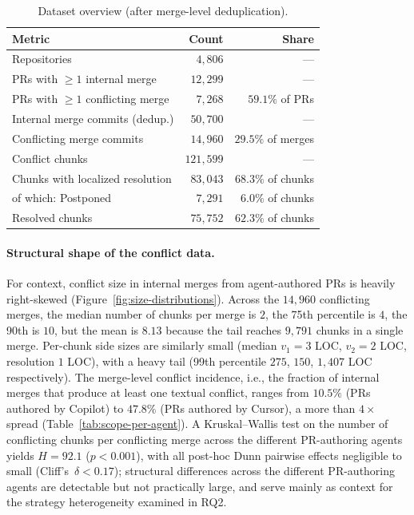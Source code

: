 \documentclass[sigconf,anonymous]{acmart}
\begin{document}
\begin{table}
  \caption{Dataset overview (after merge-level deduplication).}
  \label{tab:dataset-overview}
  \small\setlength{\tabcolsep}{4pt}
  \begin{tabular}{lrr}
    \toprule
    Metric & Count & Share \\
    \midrule
    Repositories                 & $4{,}806$  & --- \\
    PRs with $\geq 1$ internal merge      & $12{,}299$  & --- \\
    PRs with $\geq 1$ conflicting merge   & $7{,}268$   & $59.1\%$ of PRs \\
    Internal merge commits (dedup.)       & $50{,}700$  & --- \\
    Conflicting merge commits             & $14{,}960$  & $29.5\%$ of merges \\
    Conflict chunks                       & $121{,}599$ & --- \\
    Chunks with localized resolution      & $83{,}043$  & $68.3\%$ of chunks \\
    \quad of which: Postponed              & $7{,}291$   & $6.0\%$ of chunks \\
    Resolved chunks                       & $75{,}752$  & $62.3\%$ of chunks \\
    \bottomrule
  \end{tabular}
\end{table}



\paragraph{Structural shape of the conflict data.} For context, conflict size in internal merges from agent-authored PRs is heavily right-skewed (Figure~\ref{fig:size-distributions}). Across the $14{,}960$ conflicting merges, the median number of chunks per merge is $2$, the 75th percentile is $4$, the 90th is $10$, but the mean is $8.13$ because the tail reaches $9{,}791$ chunks in a single merge. Per-chunk side sizes are similarly small (median $v_1{=}3$ LOC, $v_2{=}2$ LOC, resolution $1$ LOC), with a heavy tail (99th percentile $275$, $150$, $1{,}407$ LOC respectively). The merge-level conflict incidence, i.e., the fraction of internal merges that produce at least one textual conflict, ranges from $10.5\%$ (PRs authored by Copilot) to $47.8\%$ (PRs authored by Cursor), a more than $4{\times}$ spread (Table~\ref{tab:scope-per-agent}). A Kruskal--Wallis test on the number of conflicting chunks per conflicting merge across the different PR-authoring agents yields $H{=}92.1$ ($p{<}0.001$), with all post-hoc Dunn pairwise effects negligible to small (Cliff's~$\delta{<}0.17$); structural differences across the different PR-authoring agents are detectable but not practically large, and serve mainly as context for the strategy heterogeneity examined in RQ2.
\end{document}
